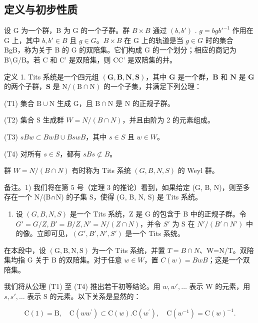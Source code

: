 \subsection{定义与初步性质}

设 G 为一个群，B 为 G 的一个子群。群 \(B \times B\) 通过 \((b, b')\) . \(g = bgb'^{-1}\) 作用在 G 上，其中 \(b, b' \in B\) 且 \(g \in G\)。\(B \times B\) 在 G 上的轨道是当 \(g \in G\) 时的集合 BgB，称为关于 B 的 G 的双陪集。它们构成 G 的一个划分；相应的商记为 B\textbackslash G/B。若 C 和 C' 是双陪集，则 CC' 是双陪集的并。

定义 1. Tits 系统是一个四元组 \((\mathbf{G},\mathbf{B},\mathbf{N},\mathbf{S})\)，其中 \(\mathbf{G}\) 是一个群，\(\mathbf{B}\) 和 \(\mathbf{N}\) 是 \(\mathbf{G}\) 的两个子群，\(\mathbf{S}\) 是 \(\mathrm{N} / (\mathrm{B}\cap \mathrm{N})\) 的一个子集，并满足下列公理：

(T1) 集合 \(\mathrm{B} \cup \mathrm{N}\) 生成 \(\mathrm{G}\)，且 \(\mathrm{B} \cap \mathrm{N}\) 是 \(\mathrm{N}\) 的正规子群。

(T2) 集合 S 生成群 \(W = N/(B \cap N)\)，并且由阶为 2 的元素组成。

(T3) \(sBw \subset BwB \cup BswB\)，其中 \(s \in S\) 且 \(w \in W\)。

(T4) 对所有 \(s \in S\)，都有 \(sBs \not\subset B\)。

群 \(W = N / (B \cap N)\) 有时称为 Tits 系统 \((G, B, N, S)\) 的 Weyl 群。

备注。1) 我们将在第 5 号（定理 3 的推论）看到，如果给定 (G, B, N)，则至多存在一个 N/(B∩N) 的子集 S，使得 (G, B, N, S) 是 Tits 系统。

\begin{enumerate}
\def\labelenumi{\arabic{enumi})}
\setcounter{enumi}{1}
\tightlist
\item
  设 \((G, B, N, S)\) 是一个 Tits 系统，Z 是 G 的包含于 B 中的正规子群。令 \(G' = G/Z, B' = B/Z, N' = N/(Z \cap N)\)，并令 \(S'\) 为 S 在 \(N'/(B' \cap N')\) 中的像。立即可见，\((G', B', N', S')\) 是一个 Tits 系统。
\end{enumerate}

在本段中，设 \((\mathrm{G},\mathrm{B},\mathrm{N},\mathrm{S})\) 为一个 Tits 系统，并置 \(T=B\cap N\)、W=N/T。双陪集均指 G 关于 B 的双陪集。对于任意 \(w\in W\)，置 \(C(w)=BwB\)；这是一个双陪集。

我们将从公理 (T1) 至 (T4) 推出若干初等结论。用 \(w, w', \ldots\) 表示 W 的元素，用 \(s, s', \ldots\) 表示 S 的元素。以下关系是显然的：

\[
\mathrm{C} (1) = \mathrm{B}, \quad \mathrm{C} (w w ^ {\prime}) \subset \mathrm{C} (w). \mathrm{C} (w ^ {\prime}), \quad \mathrm{C} (w ^ {- 1}) = \mathrm{C} (w) ^ {- 1}.\tag{1}
\]

